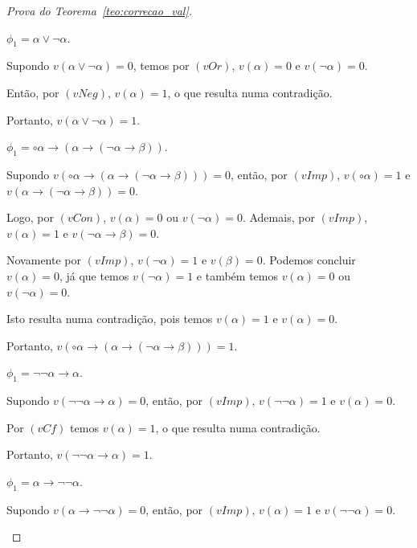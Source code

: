 \begin{proof}[Prova do Teorema~\ref{teo:correcao_val}]
\begin{provaporcasos}
\begin{provaporsubcasos}
                    \subcasodeprova{} $\phi_{1} = \alpha \lor \neg \alpha$. 
                    
                        Supondo $v(\alpha \lor \neg \alpha) = 0$, temos por $(vOr)$, $v(\alpha) = 0$ e $v(\neg \alpha) = 0$. 
                        
                        Então, por $(vNeg)$, $v(\alpha) = 1$, o que resulta numa contradição. 
                        
                        Portanto, $v(\alpha \lor \neg \alpha) = 1$.
    
                    \subcasodeprova{} $\phi_{1} = \circ \alpha \to (\alpha \to (\neg \alpha \to \beta))$. 
                    
                        Supondo $v(\circ \alpha \to (\alpha \to (\neg \alpha \to \beta))) = 0$, então, por $(vImp)$, $v(\circ \alpha) = 1$ e $v(\alpha \to (\neg \alpha \to \beta)) = 0$. 
                        
                        Logo, por $(vCon)$, $v(\alpha) = 0$ ou $v(\neg \alpha) = 0$. Ademais, por $(vImp)$, $v(\alpha) = 1$ e $v(\neg \alpha \to \beta) = 0$. 
                        
                        Novamente por $(vImp)$, $v(\neg \alpha) = 1$ e $v(\beta) = 0$. Podemos concluir $v(\alpha) = 0$, já que temos $v(\neg \alpha) = 1$ e também temos $v(\alpha) = 0$ ou $v(\neg \alpha) = 0$. 
                        
                        Isto resulta numa contradição, pois temos $v(\alpha) = 1$ e $v(\alpha) = 0$. 
                        
                        Portanto, $v(\circ \alpha \to (\alpha \to (\neg \alpha \to \beta))) = 1$.
    
                    \subcasodeprova{} $\phi_{1} = \neg \neg \alpha \to \alpha$. 
                        
                        Supondo $v(\neg \neg \alpha \to \alpha) = 0$, então, por $(vImp)$, $v(\neg \neg \alpha) = 1$ e $v(\alpha) = 0$. 
                        
                        Por $(vCf)$ temos $v(\alpha) = 1$, o que resulta numa contradição. 
                        
                        Portanto, $v(\neg \neg \alpha \to \alpha) = 1$.
    
                    \subcasodeprova{} $\phi_{1} = \alpha \to \neg \neg \alpha$. 
                    
                        Supondo $v(\alpha \to \neg \neg \alpha) = 0$, então, por $(vImp)$, $v(\alpha) = 1$ e $v(\neg \neg \alpha) = 0$. 
                        

\end{provaporsubcasos}
\end{provaporcasos}
\end{proof}
